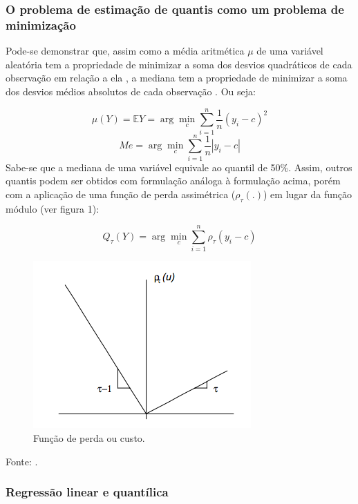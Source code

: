 \documentclass[a4paper, 12pt]{article}
\newcommand{\bcenter}{\begin{center}}
\newcommand{\ecenter}{\end{center}}
\begin{document}
\hypertarget{o-problema-de-estimacao-de-quantis-como-um-problema-de-minimizacao}{%
\subsubsection{O problema de estimação de quantis como um problema de
minimização}\label{o-problema-de-estimacao-de-quantis-como-um-problema-de-minimizacao}}

Pode-se demonstrar que, assim como a média aritmética \(\mu\) de uma
variável aleatória tem a propriedade de minimizar a soma dos desvios
quadráticos de cada observação em relação a ela
\autocite[50]{matloff2017}, a mediana tem a propriedade de minimizar a
soma dos desvios médios absolutos de cada observação
\autocite[260]{matloff2017}. Ou seja:

\[\mu(Y) = \mathbb{E}Y = \arg \min_c \sum_{i = 1}^n \frac{1}{n}(y_i - c)^2\]
\[Me = \arg \min_c \sum_{i = 1}^n \frac{1}{n}|y_i - c|\] Sabe-se que a
mediana de uma variável equivale ao quantil de 50\%. Assim, outros
quantis podem ser obtidos com formulação análoga à formulação acima,
porém com a aplicação de uma função de perda assimétrica
(\(\rho_\tau(.)\)) em lugar da função módulo (ver figura 1):

\[Q_\tau(Y) = \arg \min_c \sum_{i = 1}^n \rho_\tau(y_i - c)\]

\begin{figure}[H]

{\centering \includegraphics[width=0.7\linewidth]{DmKq7} 

}

\caption{Função de perda ou custo.}\label{fig:unnamed-chunk-1}
\end{figure}

\bcenter Fonte: \textcite{qr}. \ecenter

\hypertarget{regressao-linear-e-quantilica}{%
\subsubsection{Regressão linear e
quantílica}\label{regressao-linear-e-quantilica}}
\end{document}
